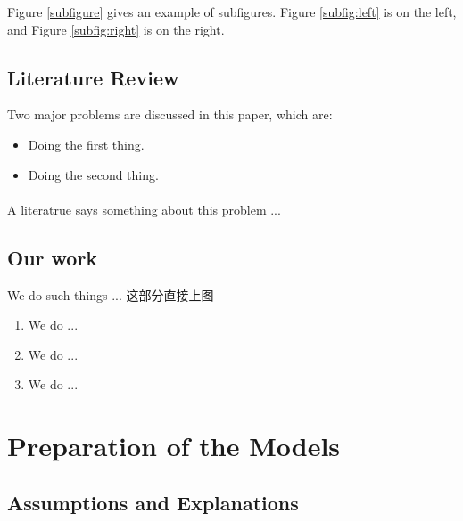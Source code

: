 \documentclass[12pt]{ctexart}
\newcommand{\upcite}[1]{\textsuperscript{\textsuperscript{\cite{#1}}}}%
\begin{document}
Figure \ref{subfigure} gives an example of subfigures. Figure \ref{subfig:left} is on the left, and Figure \ref{subfig:right} is on the right.

\subsection{Literature Review} %
Two major problems are discussed in this paper, which are:
\begin{itemize}
  \item Doing the first thing.
  \item Doing the second thing.
\end{itemize}
A literatrue\upcite{kopka2003guide} says something about this problem ...



\subsection{Our work}%
We do such things ...
这部分直接上图

\begin{enumerate}[\bfseries 1.]
  \item We do ...
  \item We do ...
  \item We do ...
\end{enumerate}
\section{Preparation of the Models}
\subsection{Assumptions and Explanations}
\end{document}
